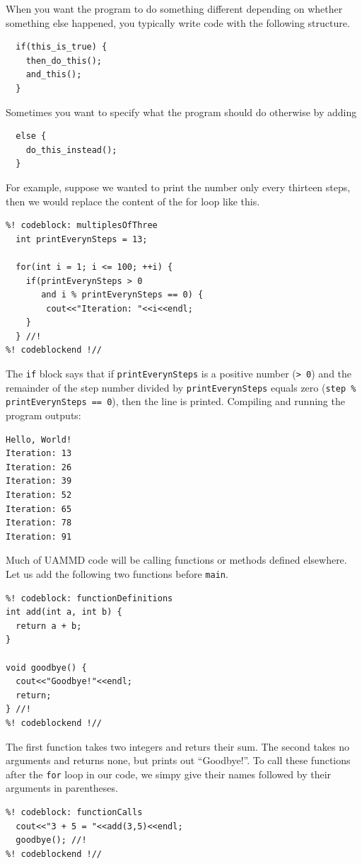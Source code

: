 When you want the program to do something different depending on whether 
something else happened, you typically write code with the following structure.
\begin{lstlisting}
  if(this_is_true) {
    then_do_this();
    and_this();
  }
\end{lstlisting}
Sometimes you want to specify what the program should do otherwise by adding
\begin{lstlisting}
  else {
    do_this_instead();
  }
\end{lstlisting}
For example, suppose we wanted to print the number only every thirteen steps,
then we would replace the content of the for loop like this.
\begin{lstlisting}
%! codeblock: multiplesOfThree
  int printEverynSteps = 13;

  for(int i = 1; i <= 100; ++i) {
    if(printEverynSteps > 0
       and i % printEverynSteps == 0) {
        cout<<"Iteration: "<<i<<endl;
    }
  } //!
%! codeblockend !//
\end{lstlisting}
The \texttt{if} block says that if \texttt{printEverynSteps} is a positive 
number (\texttt{> 0}) and the remainder of the step number divided by 
\texttt{printEverynSteps} equals zero (\texttt{step \% printEverynSteps == 0}), 
then the line is printed. Compiling and running the program outputs:
\begin{lstlisting}
Hello, World!
Iteration: 13
Iteration: 26
Iteration: 39
Iteration: 52
Iteration: 65
Iteration: 78
Iteration: 91
\end{lstlisting}

Much of UAMMD code will be calling functions or methods defined elsewhere.
Let us add the following two functions before \texttt{main}.
\begin{lstlisting}
%! codeblock: functionDefinitions
int add(int a, int b) {
  return a + b;
}

void goodbye() {
  cout<<"Goodbye!"<<endl;
  return;
} //!
%! codeblockend !//
\end{lstlisting}
The first function takes two integers and returs their sum. The second takes no
arguments and returns none, but prints out ``Goodbye!''. To call these functions
after the \texttt{for} loop in our code, we simpy give their names followed by
their arguments in parentheses.
\begin{lstlisting}
%! codeblock: functionCalls
  cout<<"3 + 5 = "<<add(3,5)<<endl;
  goodbye(); //!
%! codeblockend !//
\end{lstlisting}

